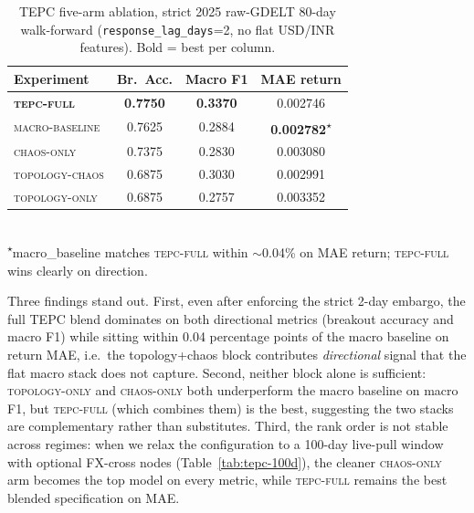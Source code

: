 \documentclass[11pt]{article}
\begin{document}
\begin{table}[H]
\centering
\small
\caption{TEPC five-arm ablation, strict 2025 raw-GDELT 80-day walk-forward (\texttt{response\_lag\_days}=2, no flat USD/INR features). Bold = best per column.}
\label{tab:tepc-ablation}
\begin{tabular}{lccc}
\toprule
\textbf{Experiment} & \textbf{Br.\ Acc.} & \textbf{Macro F1} & \textbf{MAE return} \\
\midrule
\textbf{\textsc{tepc-full}} & \textbf{0.7750} & \textbf{0.3370} & 0.002746 \\
\textsc{macro-baseline} & 0.7625 & 0.2884 & \textbf{0.002782}\textsuperscript{$\star$} \\
\textsc{chaos-only} & 0.7375 & 0.2830 & 0.003080 \\
\textsc{topology-chaos} & 0.6875 & 0.3030 & 0.002991 \\
\textsc{topology-only} & 0.6875 & 0.2757 & 0.003352 \\
\bottomrule
\end{tabular}
\\[2pt]
\footnotesize{\textsuperscript{$\star$}macro\_baseline matches \textsc{tepc-full} within $\sim$0.04\% on MAE return; \textsc{tepc-full} wins clearly on direction.}
\end{table}

Three findings stand out. First, even after enforcing the strict 2-day embargo, the full TEPC blend dominates on both directional metrics (breakout accuracy and macro F1) while sitting within 0.04 percentage points of the macro baseline on return MAE, i.e.\ the topology+chaos block contributes \emph{directional} signal that the flat macro stack does not capture. Second, neither block alone is sufficient: \textsc{topology-only} and \textsc{chaos-only} both underperform the macro baseline on macro F1, but \textsc{tepc-full} (which combines them) is the best, suggesting the two stacks are complementary rather than substitutes. Third, the rank order is not stable across regimes: when we relax the configuration to a 100-day live-pull window with optional FX-cross nodes (Table~\ref{tab:tepc-100d}), the cleaner \textsc{chaos-only} arm becomes the top model on every metric, while \textsc{tepc-full} remains the best blended specification on MAE.
\end{document}
